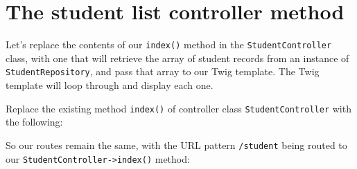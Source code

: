 \documentclass[a4paperpaper,openright]{book}
\newenvironment{Shaded}{}{}
\newcommand{\CommentTok}[1]{\textcolor[rgb]{0.38,0.63,0.69}{\textit{#1}}}
\newcommand{\KeywordTok}[1]{\textcolor[rgb]{0.00,0.44,0.13}{\textbf{#1}}}
\newcommand{\NormalTok}[1]{#1}
\newcommand{\OtherTok}[1]{\textcolor[rgb]{0.00,0.44,0.13}{#1}}
\newcommand{\StringTok}[1]{\textcolor[rgb]{0.25,0.44,0.63}{#1}}
\begin{document}
\hypertarget{the-student-list-controller-method}{%
\section{The student list controller
method}\label{the-student-list-controller-method}}

Let's replace the contents of our \texttt{index()} method in the
\texttt{StudentController} class, with one that will retrieve the array
of student records from an instance of \texttt{StudentRepository}, and
pass that array to our Twig template. The Twig template will loop
through and display each one.

Replace the existing method \texttt{index()} of controller class
\texttt{StudentController} with the following:

\begin{Shaded}
\end{Shaded}

So our routes remain the same, with the URL pattern \texttt{/student}
being routed to our \texttt{StudentController-\textgreater{}index()}
method:
\end{document}

